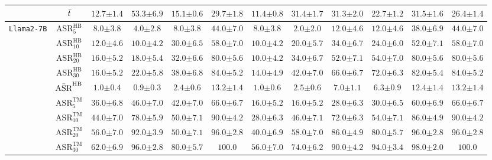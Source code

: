 \begin{table*}[t]
{\begin{tabular}{c|c||c|c|c||c|c|c|c||c|c|c}
\cline{2-12}
& $\Bar{t}$ & $12.7{\pm 1.4}$ & $53.3{\pm 6.9}$ & $15.1{\pm 0.6}$ & $29.7{\pm 1.8}$ & $\mathbf{11.4{\pm 0.8}}$ & $31.4{\pm 1.7}$ & $31.3{\pm 2.0}$ & $22.7{\pm 1.2}$ & $31.5{\pm 1.6}$ & $26.4{\pm 1.4}$ \\
\hline
\hline
\multirow{11}{*}{\texttt{Llama2-7B}} 
& $\text{ASR}^{\text{HB}}_{5}$ & $8.0{\pm 3.8}$ & $4.0{\pm 2.8}$ & $8.0{\pm 3.8}$ & $\mathbf{44.0{\pm 7.0}}$ & $8.0{\pm 3.8}$ & $2.0{\pm 2.0}$ & $12.0{\pm 4.6}$ & $12.0{\pm 4.6}$ & $38.0{\pm 6.9}$ & $\mathbf{44.0{\pm 7.0}}$ \\
& $\text{ASR}^{\text{HB}}_{10}$ & $12.0{\pm 4.6}$ & $10.0{\pm 4.2}$ & $30.0{\pm 6.5}$ & $\mathbf{58.0{\pm 7.0}}$ & $10.0{\pm 4.2}$ & $20.0{\pm 5.7}$ & $34.0{\pm 6.7}$ & $24.0{\pm 6.0}$ & $52.0{\pm 7.1}$ & $\mathbf{58.0{\pm 7.0}}$ \\
& $\text{ASR}^{\text{HB}}_{20}$ & $16.0{\pm 5.2}$ & $18.0{\pm 5.4}$ & $32.0{\pm 6.6}$ & $\mathbf{80.0{\pm 5.6}}$ & $10.0{\pm 4.2}$ & $34.0{\pm 6.7}$ & $52.0{\pm 7.1}$ & $54.0{\pm 7.0}$ & $\mathbf{80.0{\pm 5.6}}$ & $\mathbf{80.0{\pm 5.6}}$ \\
& $\text{ASR}^{\text{HB}}_{30}$ & $16.0{\pm 5.2}$ & $22.0{\pm 5.8}$ & $38.0{\pm 6.8}$ & $\mathbf{84.0{\pm 5.2}}$ & $14.0{\pm 4.9}$ & $42.0{\pm 7.0}$ & $66.0{\pm 6.7}$ & $72.0{\pm 6.3}$ & $82.0{\pm 5.4}$ & $\mathbf{84.0{\pm 5.2}}$ \\
& $\Bar{\text{ASR}}^{\text{HB}}$ & $1.0{\pm 0.4}$ & $0.9{\pm 0.3}$ & $2.4{\pm 0.6}$ & $\mathbf{13.2{\pm 1.4}}$ & $1.0{\pm 0.6}$ & $2.5{\pm 0.6}$ & $7.0{\pm 1.1}$ & $6.3{\pm 0.9}$ & $12.4{\pm 1.4}$ & $\mathbf{13.2{\pm 1.4}}$ \\
\cline{2-12}
& $\text{ASR}^{\text{TM}}_{5}$ & $36.0{\pm 6.8}$ & $46.0{\pm 7.0}$ & $42.0{\pm 7.0}$ & $\mathbf{66.0{\pm 6.7}}$ & $16.0{\pm 5.2}$ & $16.0{\pm 5.2}$ & $28.0{\pm 6.3}$ & $30.0{\pm 6.5}$ & $60.0{\pm 6.9}$ & $\mathbf{66.0{\pm 6.7}}$ \\
& $\text{ASR}^{\text{TM}}_{10}$ & $44.0{\pm 7.0}$ & $78.0{\pm 5.9}$ & $50.0{\pm 7.1}$ & $\mathbf{90.0{\pm 4.2}}$ & $28.0{\pm 6.3}$ & $46.0{\pm 7.1}$ & $72.0{\pm 6.3}$ & $54.0{\pm 7.1}$ & $86.0{\pm 4.9}$ & $\mathbf{90.0{\pm 4.2}}$ \\
& $\text{ASR}^{\text{TM}}_{20}$ & $56.0{\pm 7.0}$ & $92.0{\pm 3.9}$ & $50.0{\pm 7.1}$ & $\mathbf{96.0{\pm 2.8}}$ & $40.0{\pm 6.9}$ & $58.0{\pm 7.0}$ & $86.0{\pm 4.9}$ & $80.0{\pm 5.7}$ & $\mathbf{96.0{\pm 2.8}}$ & $\mathbf{96.0{\pm 2.8}}$ \\
& $\text{ASR}^{\text{TM}}_{30}$ & $62.0{\pm 6.9}$ & $96.0{\pm 2.8}$ & $80.0{\pm 5.7}$ & $\mathbf{100.0}$ & $56.0{\pm 7.0}$ & $74.0{\pm 6.2}$ & $90.0{\pm 4.2}$ & $94.0{\pm 3.4}$ & $98.0{\pm 2.0}$ & $\mathbf{100.0}$ \\

\end{tabular}}
\end{table*}

